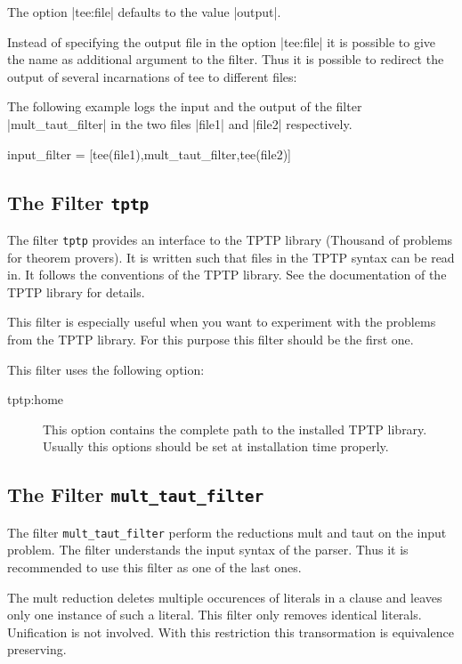 The option |tee:file| defaults to the value |output|.

Instead of specifying the output file in the option |tee:file| it is possible
to give the name as additional argument to the filter. Thus it is possible to
redirect the output of several incarnations of tee to different files:

The following example logs the input and the output of the filter
|mult_taut_filter| in the two files |file1| and |file2| respectively.

\begin{BoxedSample}
  input\_filter = [tee(file1),mult\_taut\_filter,tee(file2)]
\end{BoxedSample}


\subsection{The Filter {\tt tptp}}

The filter {\tt tptp} provides an interface to the TPTP library (Thousand of
problems for theorem provers). It is written such that files in the TPTP
syntax can be read in. It follows the conventions of the TPTP library. See the
documentation of the TPTP library for details.

This filter is especially useful when you want to experiment with the problems
from the TPTP library. For this purpose this filter should be the first one.

This filter uses the following option:
\begin{description}
\item[tptp:home] This option contains the complete path to the installed TPTP
  library. Usually this options should be set at installation time properly.
\end{description}


\subsection{The Filter {\tt mult\_taut\_filter}}

The filter {\tt mult\_taut\_filter} perform the reductions mult and taut on
the input problem. The filter understands the input syntax of the parser. Thus
it is recommended to use this filter as one of the last ones.

The mult reduction deletes multiple occurences of literals in a clause and
leaves only one instance of such a literal. This filter only removes identical
literals. Unification is not involved. With this restriction this
transormation is equivalence preserving.

